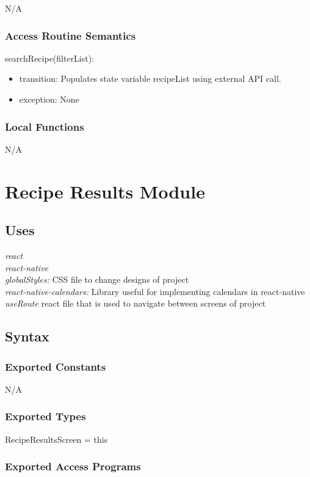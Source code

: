 \documentclass[12pt, titlepage]{article}
\begin{document}
N/A

\subsubsection{Access Routine Semantics}

\noindent searchRecipe(filterList):
\begin{itemize}
	\item transition: Populates state variable recipeList using external API call.
	\item exception: None 
\end{itemize}

\subsubsection{Local Functions}

N/A

\section{Recipe Results Module} \label{Module} 

\subsection{Uses}
{\textit{react}}\\
{\textit{react-native}}\\
{\textit{globalStyles:} CSS file to change designs of project}\\
{\textit{react-native-calendars:} Library useful for implementing calendars in react-native}\\
{\textit{useRoute} react file that is used to navigate between screens of project}\\
\subsection{Syntax}

\subsubsection{Exported Constants}
N/A

\subsubsection{Exported Types}
RecipeResultsScreen = this

\subsubsection{Exported Access Programs}
\end{document}
